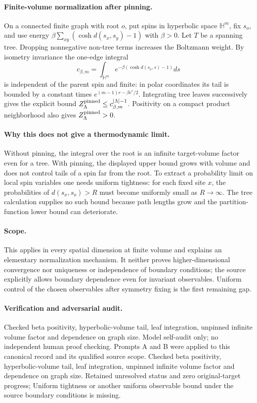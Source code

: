 \documentclass[11pt]{article}
\begin{document}
\paragraph{Finite-volume normalization after pinning.} On a connected finite graph with root $o$, put spins in hyperbolic space $\mathbb H^m$, fix $s_o$, and use energy $\beta\sum_{xy}(\cosh d(s_x,s_y)-1)$ with $\beta>0$. Let $T$ be a spanning tree. Dropping nonnegative non-tree terms increases the Boltzmann weight. By isometry invariance the one-edge integral
\[
 c_{\beta,m}=\int_{\mathbb H^m}e^{-\beta(\cosh d(s_o,s)-1)}ds
\]
is independent of the parent spin and finite: in polar coordinates its tail is bounded by a constant times $e^{(m-1)r-\beta e^r/2}$. Integrating tree leaves successively gives the explicit bound $Z_{\Lambda}^{\rm pinned}\leq c_{\beta,m}^{|\Lambda|-1}$. Positivity on a compact product neighborhood also gives $Z_{\Lambda}^{\rm pinned}>0$.

\paragraph{Why this does not give a thermodynamic limit.} Without pinning, the integral over the root is an infinite target-volume factor even for a tree. With pinning, the displayed upper bound grows with volume and does not control tails of a spin far from the root. To extract a probability limit on local spin variables one needs uniform tightness: for each fixed site $x$, the probabilities of $d(s_x,s_o)>R$ must become uniformly small as $R\to\infty$. The tree calculation supplies no such bound because path lengths grow and the partition-function lower bound can deteriorate.

\paragraph{Scope.} This applies in every spatial dimension at finite volume and explains an elementary normalization mechanism. It neither proves higher-dimensional convergence nor uniqueness or independence of boundary conditions; the source explicitly allows boundary dependence even for invariant observables. Uniform control of the chosen observables after symmetry fixing is the first remaining gap.

\paragraph{Verification and adversarial audit.}
Checked beta positivity, hyperbolic-volume tail, leaf integration, unpinned infinite volume factor and dependence on graph size. Model self-audit only; no independent human proof checking. Prompts A and B were applied to this canonical record and its qualified source scope. Checked beta positivity, hyperbolic-volume tail, leaf integration, unpinned infinite volume factor and dependence on graph size. Retained unresolved status and zero original-target progress; Uniform tightness or another uniform observable bound under the source boundary conditions is missing.
\end{document}
